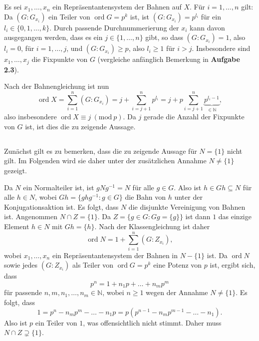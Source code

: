\documentclass[a4paper,10pt]{article}
\theoremstyle{definition}
\newcommand{\N}{\mathbb{N}}
\newcommand{\ord}{\operatorname{ord}}
\begin{document}
\section{}

\subsection{}
Es sei $x_1, \ldots, x_n$ ein Repräsentantensystem der Bahnen auf $X$. Für $i=1,\ldots,n$ gilt: Da $(G : G_{x_i})$ ein Teiler von $\ord G = p^k$ ist, ist $(G : G_{x_i}) = p^{l_i}$ für ein $l_i \in \{0, 1, \ldots, k\}$. Durch passende Durchnummerierung der $x_i$ kann davon ausgegangen werden, dass es ein $j \in \{1,\ldots,n\}$ gibt, so dass $(G : G_{x_i}) = 1$, also $l_i = 0$, für $i=1,\ldots,j$, und $(G : G_{x_i}) \geq p$, also $l_i \geq 1$ für $i > j$. Insbesondere sind $x_1, \ldots, x_j$ die Fixpunkte von $G$ (vergleiche anfänglich Bemerkung in \textbf{Aufgabe 2.3}).

Nach der Bahnengleichung ist nun
\[
 \ord X
 = \sum_{i=1}^n (G : G_{x_i})
 = j + \sum_{i=j+1}^n p^{l_i}
 = j + p \sum_{i=j+1}^n \underbrace{p^{l_i - 1}}_{\in \N},
\]
also insbesondere $\ord X \equiv j\ (\textrm{mod}\ p)$. Da $j$ gerade die Anzahl der Fixpunkte von $G$ ist, ist dies die zu zeigende Aussage.


\subsection{}
Zunächst gilt es zu bemerken, dass die zu zeigende Aussage für $N = \{1\}$ nicht gilt. Im Folgenden wird sie daher unter der zusätzlichen Annahme $N \neq \{1\}$ gezeigt.

Da $N$ ein Normalteiler ist, ist $gNg^{-1} = N$ für alle $g \in G$. Also ist $h \in Gh \subseteq N$ für alle $h \in N$, wobei $Gh = \{ghg^{-1} : g \in G\}$ die Bahn von $h$ unter der Konjugationsaktion ist. Es folgt, dass $N$ die disjunkte Vereinigung von Bahnen ist. Angenommen $N \cap Z = \{1\}$. Da $Z = \{g \in G : Gg = \{g\}\}$ ist dann $1$ das einzige Element $h \in N$ mit $Gh = \{h\}$. Nach der Klassengleichung ist daher
\[
 \ord N = 1 + \sum_{i=1}^n (G : Z_{x_i}),
\]
wobei $x_1, \ldots, x_n$ ein Repräsentantensystem der Bahnen in $N-\{1\}$ ist. Da $\ord N$ sowie jedes $(G : Z_{x_i})$ als Teiler von $\ord G = p^k$ eine Potenz von $p$ ist, ergibt sich, dass
\[
 p^n = 1 + n_1 p + \ldots + n_m p^m
\]
für passende $n,m, n_1, \ldots, n_m \in \N$, wobei $n \geq 1$ wegen der Annahme $N \neq \{1\}$. Es folgt, dass
\[
 1 = p^n - n_m p^m - \ldots - n_1 p = p ( p^{n-1} - n_m p^{m-1} - \ldots - n_1 ).
\]
Also ist $p$ ein Teiler von $1$, was offensichtlich nicht stimmt. Daher muss $N \cap Z \supsetneq \{1\}$.
\end{document}
